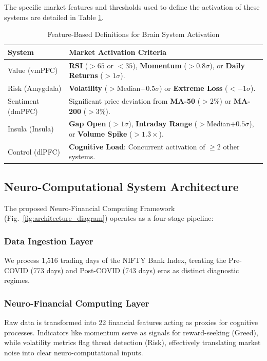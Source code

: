 \documentclass[conference]{IEEEtran}
\begin{document}
The specific market features and thresholds used to define the activation of these systems are detailed in Table \ref{tab:feature_mapping}.

\begin{table}[htbp]
\centering
\caption{Feature-Based Definitions for Brain System Activation}
\label{tab:feature_mapping}
\small
\begin{tabular}{@{}p{2.0cm}p{6.0cm}@{}}
\toprule
\textbf{System} & \textbf{Market Activation Criteria} \\
\midrule
Value (vmPFC) & \textbf{RSI} ($>65$ or $<35$), \textbf{Momentum} ($>0.8\sigma$), or \textbf{Daily Returns} ($>1\sigma$). \\
Risk (Amygdala) & \textbf{Volatility} ($>$Median$+0.5\sigma$) or \textbf{Extreme Loss} ($<-1\sigma$). \\
Sentiment (dmPFC) & Significant price deviation from \textbf{MA-50} ($>2\%$) or \textbf{MA-200} ($>3\%$). \\
Insula (Insula) & \textbf{Gap Open} ($>1\sigma$), \textbf{Intraday Range} ($>$Median$+0.5\sigma$), or \textbf{Volume Spike} ($>1.3\times$). \\
Control (dlPFC) & \textbf{Cognitive Load}: Concurrent activation of $\geq 2$ other systems. \\
\bottomrule
\end{tabular}
\end{table}

\subsection{Neuro-Computational System Architecture}
The proposed Neuro-Financial Computing Framework (Fig.~\ref{fig:architecture_diagram}) operates as a four-stage pipeline:

\subsubsection{Data Ingestion Layer}
We process 1,516 trading days of the NIFTY Bank Index, treating the Pre-COVID (773 days) and Post-COVID (743 days) eras as distinct diagnostic regimes.

\subsubsection{Neuro-Financial Computing Layer}
Raw data is transformed into 22 financial features acting as proxies for cognitive processes. Indicators like momentum serve as signals for reward-seeking (Greed), while volatility metrics flag threat detection (Risk), effectively translating market noise into clear neuro-computational inputs.
\end{document}
